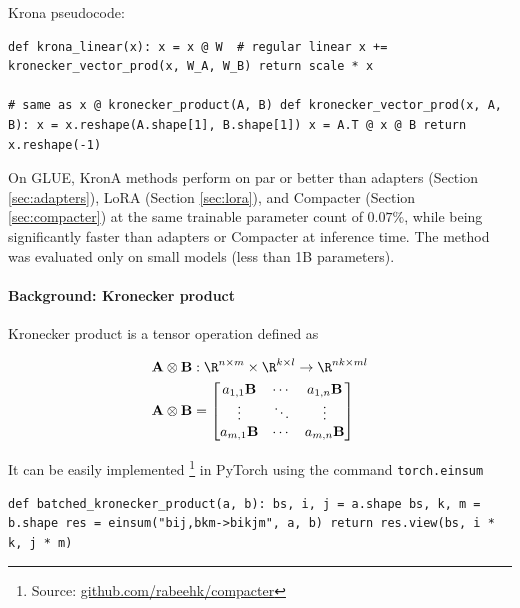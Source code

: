 Krona pseudocode:

\begin{lstlisting}
def krona_linear(x): x = x @ W  # regular linear x += kronecker_vector_prod(x, W_A, W_B) return scale * x

# same as x @ kronecker_product(A, B) def kronecker_vector_prod(x, A, B): x = x.reshape(A.shape[1], B.shape[1]) x = A.T @ x @ B return x.reshape(-1)
\end{lstlisting}

On GLUE, KronA methods perform on par or better than adapters (Section \ref{sec:adapters}), LoRA (Section \ref{sec:lora}), and Compacter (Section \ref{sec:compacter}) at the same trainable parameter count of $0.07\%$, while being significantly faster than adapters or Compacter at inference time. The method was evaluated only on small models (less than 1B parameters).

\paragraph{Background: Kronecker product} Kronecker product is a tensor operation defined as

\begin{equation}
\begin{aligned}
\mathbf{A} \otimes \mathbf{B} &: \R^{n \times m} \times \R^{k \times l} \rightarrow \R^{nk \times ml}\\
\mathbf{A} \otimes \mathbf{B} &= 
    \begin{bmatrix}
    a_{1,1} \mathbf{B} & \cdots & a_{1,n} \mathbf{B} \\
    \vdots & \ddots & \vdots \\
    a_{m,1} \mathbf{B} & \cdots & a_{m,n} \mathbf{B}
    \end{bmatrix}
\end{aligned}
\end{equation}

It can be easily implemented \footnote{Source: \url{github.com/rabeehk/compacter}} in PyTorch using the command {\small{ \texttt{torch.einsum} }}

\begin{lstlisting}
def batched_kronecker_product(a, b): bs, i, j = a.shape bs, k, m = b.shape res = einsum("bij,bkm->bikjm", a, b) return res.view(bs, i * k, j * m)
\end{lstlisting}

